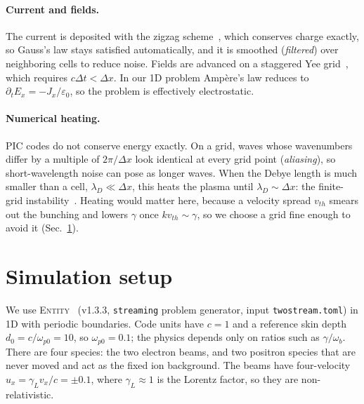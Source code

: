 \documentclass[10pt,twocolumn,letterpaper]{article}
\newcommand{\wb}{\omega_b}            %
\begin{document}
\paragraph{Current and fields.}
The current is deposited with the zigzag scheme~\citep{Umeda2003}, which conserves charge
exactly, so Gauss's law
stays satisfied automatically, and it is smoothed (\emph{filtered}) over neighboring cells to
reduce noise. Fields are advanced on a staggered Yee grid~\citep{Yee1966}, which requires
$c\Delta t<\Delta x$. In our 1D problem Amp\`ere's law reduces to
$\partial_t E_x=-J_x/\varepsilon_0$, so the problem is effectively electrostatic.

\paragraph{Numerical heating.}
PIC codes do not conserve energy exactly. On a grid, waves whose wavenumbers differ by a
multiple of $2\pi/\Delta x$ look identical at every grid point (\emph{aliasing}), so
short-wavelength noise can pose as longer waves. When the Debye length is much smaller than a
cell, $\lambda_D\ll\Delta x$, this heats the plasma until $\lambda_D\sim\Delta x$: the
finite-grid instability~\citep{Langdon1970,Okuda1972}. Heating would matter here, because a
velocity spread $v_{th}$ smears out the bunching and lowers $\gamma$ once $k v_{th}\sim\gamma$, so
we choose a grid fine enough to avoid it (Sec.~\ref{sec:setup}).

\section{Simulation setup}
\label{sec:setup}

We use \textsc{Entity}~\citep{Entity} (v1.3.3, \texttt{streaming} problem generator, input
\texttt{twostream.toml}) in 1D with periodic boundaries. Code units have $c=1$ and a reference
skin depth $d_0=c/\omega_{p0}=10$, so $\omega_{p0}=0.1$; the physics depends only on ratios such
as $\gamma/\wb$. There are four species: the two electron beams, and two positron species that
are never moved and act as the fixed ion background. The beams have four-velocity
$u_x=\gamma_L v_x/c=\pm0.1$, where $\gamma_L\approx1$ is the Lorentz factor, so they are
non-relativistic.
\end{document}
